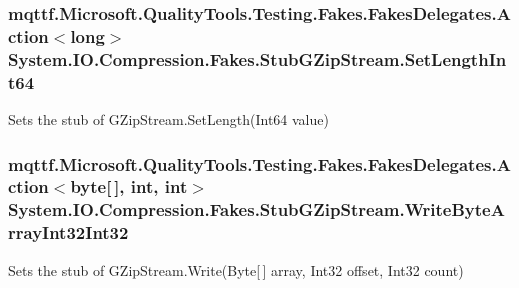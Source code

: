 \hypertarget{class_system_1_1_i_o_1_1_compression_1_1_fakes_1_1_stub_g_zip_stream_ae689969ec735469f1c260b4c961ec21d}{
\subsubsection[{Set\-Length\-Int64}]{\setlength{\rightskip}{0pt plus 5cm}mqttf.\-Microsoft.\-Quality\-Tools.\-Testing.\-Fakes.\-Fakes\-Delegates.\-Action$<$long$>$ System.\-I\-O.\-Compression.\-Fakes.\-Stub\-G\-Zip\-Stream.\-Set\-Length\-Int64}}\label{class_system_1_1_i_o_1_1_compression_1_1_fakes_1_1_stub_g_zip_stream_ae689969ec735469f1c260b4c961ec21d}


Sets the stub of G\-Zip\-Stream.\-Set\-Length(\-Int64 value)

\hypertarget{class_system_1_1_i_o_1_1_compression_1_1_fakes_1_1_stub_g_zip_stream_a3dfcc317aec5640f8de5290f27b8678a}{
\subsubsection[{Write\-Byte\-Array\-Int32\-Int32}]{\setlength{\rightskip}{0pt plus 5cm}mqttf.\-Microsoft.\-Quality\-Tools.\-Testing.\-Fakes.\-Fakes\-Delegates.\-Action$<$byte\mbox{[}$\,$\mbox{]}, int, int$>$ System.\-I\-O.\-Compression.\-Fakes.\-Stub\-G\-Zip\-Stream.\-Write\-Byte\-Array\-Int32\-Int32}}\label{class_system_1_1_i_o_1_1_compression_1_1_fakes_1_1_stub_g_zip_stream_a3dfcc317aec5640f8de5290f27b8678a}


Sets the stub of G\-Zip\-Stream.\-Write(\-Byte\mbox{[}$\,$\mbox{]} array, Int32 offset, Int32 count)

